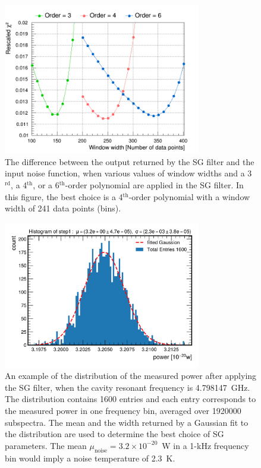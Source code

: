 \begin{figure} [htbp]
  \centering
  \includegraphics[width=8.6cm]{figures/chi2_Different_Order_Window_SGFilter.png}
  \caption{The difference between the output returned by the SG filter 
  and the input noise function, when various values of window widths and 
  a 3$^\text{rd}$, a 4$^\text{th}$, or a 
  6$^\text{th}$-order polynomial are applied in the SG filter. In this 
  figure, the best choice is a 4$^\text{th}$-order polynomial with 
  a window width of 241 data points (bins). }
  \label{fig:sgoptimize}
\end{figure}
 


\begin{figure} [htbp]
  \centering
  \includegraphics[width=8.6cm]{figures/sysSG_temphistogram.png}
  \caption{An example of the distribution of the measured power after 
applying the SG filter, when 
the cavity resonant frequency is 4.798147~GHz. The distribution contains 
1600 entries and each entry corresponds to the measured power 
in one frequency bin, averaged
over 1920000 subspectra. The mean and the width returned by 
a Gaussian fit to the distribution are used to determine the best choice of 
SG parameters. The mean $\mu_\text{noise}=3.2\times10^{-20}$~W in 
a 1-kHz frequency bin would imply a noise temperature of 2.3~K.}
  \label{fig:noisegauss}
\end{figure}
 

